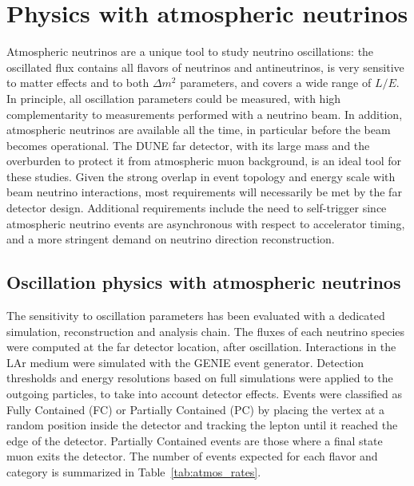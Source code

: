 \section{Physics with atmospheric neutrinos}
\label{sec:nonaccel-atm}

Atmospheric neutrinos are a unique tool to study neutrino oscillations: the oscillated flux contains all flavors of neutrinos and antineutrinos, is very sensitive to matter effects and to both $\Delta m^2$ parameters, and covers a wide range of $L/E$. In principle, all oscillation parameters could be measured, with high
complementarity to measurements performed with a neutrino beam. In addition, atmospheric neutrinos are available all the time, in particular before the beam becomes operational. The DUNE far detector, with its large mass and the overburden to protect it from atmospheric muon background, is an ideal tool for these studies.  Given the strong overlap in event topology and energy scale with beam neutrino interactions, most requirements will necessarily be met by the far detector design. Additional requirements include the need to self-trigger since atmospheric neutrino events are asynchronous with respect to accelerator timing, and a more stringent demand on neutrino direction reconstruction.

\subsection{Oscillation physics with atmospheric neutrinos}
\label{sec:nonaccel-atm-oscillations}

The sensitivity to oscillation parameters has been evaluated with a 
dedicated simulation, reconstruction and analysis chain. 
The fluxes of each neutrino species were computed at the far detector location, after 
oscillation. Interactions in the LAr medium were simulated with the GENIE event 
generator. Detection thresholds and energy resolutions based on full 
simulations were applied to the outgoing particles, to take into account 
detector effects. Events were classified as Fully Contained (FC) or 
Partially Contained (PC) by placing the vertex at a random position inside the 
detector and tracking the lepton until it reached the edge of the detector. %
Partially Contained events 
are those where a final state muon exits the detector.  The number of events expected 
for each flavor and category is summarized in Table~\ref{tab:atmos_rates}.

